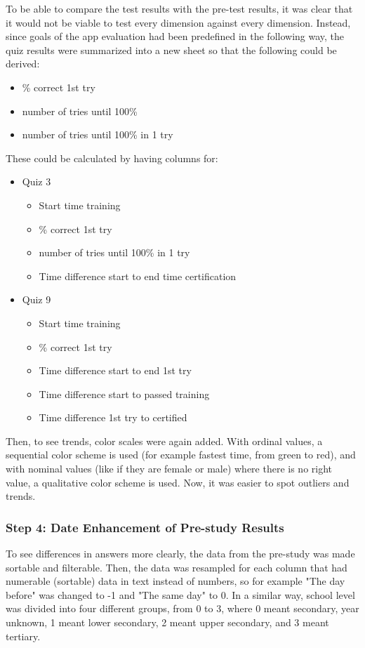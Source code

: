 To be able to compare the test results with the pre-test results, it was clear that it would not be viable to test every dimension against every dimension. Instead, since goals of the app evaluation had been predefined in the following way, the quiz results were summarized into a new sheet so that the following could be derived:

\begin{itemize}
\item \% correct 1st try
\item number of tries until 100\%
\item number of tries until 100\% in 1 try
\end{itemize}

These could be calculated by having columns for:

\begin{itemize}
  \item Quiz 3
  \begin{itemize}
    \item Start time training
    \item \% correct 1st try
    \item number of tries until 100\% in 1 try
    \item Time difference start to end time certification
  \end{itemize}
  \item Quiz 9
  \begin{itemize}
    \item Start time training
    \item \% correct 1st try
    \item Time difference start to end 1st try
    \item Time difference start to passed training
    \item Time difference 1st try to certified
  \end{itemize}
\end{itemize}

Then, to see trends, color scales were again added. With ordinal values, a sequential color scheme is used (for example fastest time, from green to red), and with nominal values (like if they are female or male) where there is no right value, a qualitative color scheme is used. Now, it was easier to spot outliers and trends.

\subsubsection{Step 4: Date Enhancement of Pre-study Results}
To see differences in answers more clearly, the data from the pre-study was made sortable and filterable. Then, the data was resampled for each column that had numerable (sortable) data in text instead of numbers, so for example "The day before" was changed to -1 and "The same day" to 0. In a similar way, school level was divided into four different groups, from 0 to 3, where 0 meant secondary, year unknown, 1 meant lower secondary, 2 meant upper secondary, and 3 meant tertiary.

